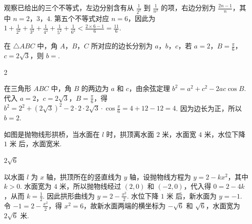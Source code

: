 \begin{solution}
观察已给出的三个不等式，左边分别含有从 \(\frac{1}{2^2}\) 到 \(\frac{1}{n^2}\) 的项，右边分别为 \(\frac{2n-1}{n}\)，其中 \(n=2\)，\(3\)，\(4\). 第五个不等式对应 \(n=6\)，因此为 \(1+\frac{1}{2^2}+\frac{1}{3^2}+\frac{1}{4^2}+\frac{1}{5^2}+\frac{1}{6^2}<\frac{2\times6-1}{6}=\frac{11}{6}\).
\end{solution}

\begin{problem}
在 \(\triangle ABC\) 中，角 \(A\)，\(B\)，\(C\) 所对应的边长分别为 \(a\)，\(b\)，\(c\)，若 \(a = 2\)，\(B = \frac{\pi}{6}\)，\(c = 2\sqrt{3}\)，则 \(b = \)\fillinblank{}.
\end{problem}

\begin{answer}
2
\end{answer}

\begin{solution}
在三角形 \(ABC\) 中，角 \(B\) 的两边为 \(a\) 和 \(c\)，由余弦定理 \(b^2=a^2+c^2-2ac\cos B\). 代入 \(a=2\)，\(c=2\sqrt3\)，\(B=\frac{\pi}{6}\)，得 \(b^2=2^2+(2\sqrt3)^2-2\cdot2\cdot2\sqrt3\cdot\cos\frac{\pi}{6}=4+12-12=4\). 因为边长为正，所以 \(b=2\).
\end{solution}

\begin{problem}
如图是抛物线形拱桥，当水面在 \(l\) 时，拱顶离水面 \(2\text{ 米}\)，水面宽 \(4\text{ 米}\)，水位下降 \(1\text{ 米}\) 后，水面宽\fillinblank{}\(\text{米}\).

\begin{minipage}{\linewidth}
\centering
{}
\end{minipage}
\end{problem}

\begin{answer}
\(2\sqrt{6}\)
\end{answer}

\begin{solution}
以水面 \(l\) 为 \(x\) 轴，拱顶所在的竖直线为 \(y\) 轴，设抛物线方程为 \(y=2-kx^2\)，其中 \(k>0\). 水面宽为 \(4\text{ 米}\)，所以抛物线经过 \((2,0)\) 和 \((-2,0)\)，代入得 \(0=2-4k\)，从而 \(k=\frac{1}{2}\). 因此拱形曲线为 \(y=2-\frac{x^2}{2}\). 水位下降 \(1\text{ 米}\) 后，新水面为 \(y=-1\). 令 \(-1=2-\frac{x^2}{2}\)，得 \(x^2=6\)，故新水面两端的横坐标为 \(-\sqrt6\) 和 \(\sqrt6\)，水面宽为 \(2\sqrt6\text{ 米}\).
\end{solution}

